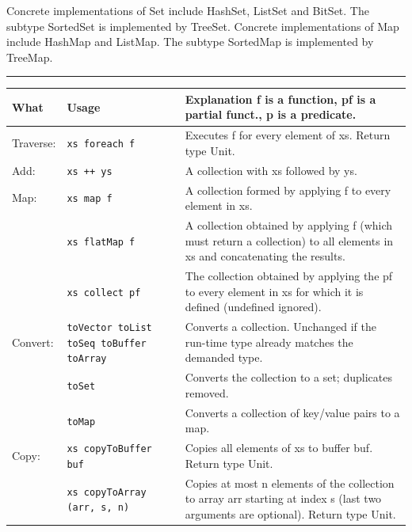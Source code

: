 \documentclass[article, a5paper]{memoir}
\newcommand{\LangColor}{red}
\newcommand{\head}[1]{{\bfseries {\color{\LangColor}{#1}}\par\vspace{1mm}\hrule\vspace{-2mm}}}
\renewcommand{\arraystretch}{0.9}
\newcommand{\Newline}{\vspace{\baselineskip}}
\begin{document}
{\small Concrete implementations of Set include HashSet, ListSet and BitSet. The subtype SortedSet is implemented by TreeSet.
Concrete implementations of Map include HashMap and ListMap. The subtype SortedMap is implemented by TreeMap.

}

\clearpage

\head{Methods in trait \texttt{Traversable[A]}}\Newline

{\small\renewcommand{\arraystretch}{1.2}
\begin{tabular}{@{}l p{3.5cm} p{6.8cm}}
\textbf{What} & \textbf{Usage} & \textbf{Explanation} f is a function, pf is a partial funct., p is a predicate.\\ \hline
Traverse: & \texttt{xs foreach f} & Executes f for every element of xs. Return type Unit.\\ \cline{1-3}

  Add: & \texttt{xs ++ ys} & A collection with xs followed by ys.\\\cline{1-3}
  
  Map: & \texttt{xs map f} & A collection formed by applying f to every element in xs.\\ \cline{2-3}
       & \texttt{xs flatMap f} & A collection obtained by applying f (which must return a collection) to all elements in xs and concatenating the results.\\ \cline{2-3}
       & \texttt{xs collect pf} & The collection obtained by applying the pf to every element in xs for which it is defined (undefined ignored).\\ \cline{1-3}

  Convert: & \texttt{toVector toList toSeq toBuffer toArray} & Converts a collection. Unchanged if the run-time type already matches the demanded type.\\ \cline{2-3}
   & \texttt{toSet} & Converts the collection to a set; duplicates removed.\\ \cline{2-3}
   & \texttt{toMap} & Converts a collection of key/value pairs to a map. \\ \cline{1-3}

  Copy: & \texttt{xs copyToBuffer buf } & Copies all elements of xs to buffer buf. Return type Unit.\\ \cline{2-3}
   & \texttt{xs copyToArray (arr, s, n)} & Copies at most n elements of the collection to array arr starting at index s (last two arguments are optional). Return type Unit.\\ \cline{1-3}


\end{tabular}}
\end{document}
